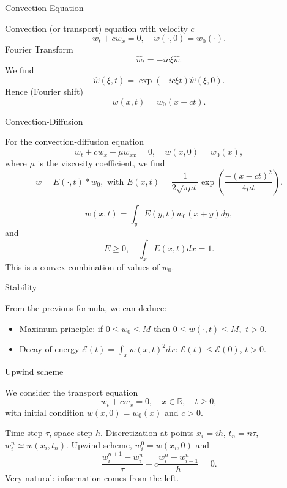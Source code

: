 \documentclass[english]{beamer}
\begin{document}
\begin{frame}{Convection Equation}

Convection (or transport) equation with velocity $c$
\[
w_{t}+cw_{x}=0,\quad w(\cdot,0)=w_{0}(\cdot).
\]
Fourier Transform
\[
\hat{w}_{t}=-ic\xi\hat{w}.
\]
We find
\[
\hat{w}(\xi,t)=\exp(-ic\xi t)\hat{w}(\xi,0).
\]
Hence (Fourier shift)
\[
w(x,t)=w_{0}(x-ct).
\]

\end{frame}

%

\begin{frame}{Convection-Diffusion}

For the convection-diffusion equation
\[
w_{t}+cw_{x}-\mu w_{xx}=0,\quad w(x,0)=w_{0}(x),
\]
where $\mu$ is the viscosity coefficient, we find
\[
w=E(\cdot,t)*w_{0},\text{ with }E(x,t)=\frac{1}{2\sqrt{\pi\mu t}}\exp(\frac{-(x-ct)^{2}}{4\mu t}).
\]

$$w(x,t)=\int_{y}E(y,t)w_{0}(x+y)dy,$$
and
$$E\geq0,\quad\int_{x}E(x,t)dx=1.$$
This is a convex combination of values of $w_{0}$.

\end{frame}

\begin{frame}{Stability}

From the previous formula, we can deduce:
\begin{itemize}

\item Maximum principle: if $0\leq w_{0}\leq M$ then $0\leq w(\cdot,t)\leq M,$
$t>0$.



\item Decay of energy $\mathcal{E}(t)=\int_{x}w(x,t)^{2}dx$: $\mathcal{E}(t)\leq\mathcal{E}(0)$, $t>0$.
\end{itemize}
\end{frame}




\begin{frame}{Upwind scheme}

We consider the transport equation
\[
w_{t}+cw_{x}=0,\quad x\in\mathbb{R},\quad t\geq0,
\]
with initial condition $w(x,0)=w_{0}(x)$ and $c>0$.

Time step $\tau$, space step $h$. Discretization at points
$x_{i}=ih$, $t_{n}=n\tau$, $w_{i}^{n}\simeq w(x_{i},t_{n})$. Upwind scheme, $w_{i}^{0}=w(x_{i},0)$ and
\[
\frac{w_{i}^{n+1}-w_{i}^{n}}{\tau}+c\frac{w_{i}^{n}-w_{i-1}^{n}}{h}=0.
\]
Very natural: information comes from the left. 
\end{frame}
%
\end{document}
